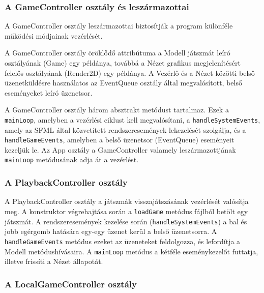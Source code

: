 \documentclass[12pt, twoside]{report}
\begin{document}
\subsubsection{A GameController osztály és leszármazottai}

A GameController osztály leszármazottai biztosítják a program különféle működési módjainak vezérlését. 

A GameController osztály öröklődő attribútuma a Modell játszmát leíró osztályának (Game) egy példánya, továbbá a Nézet grafikus megjelenítésért felelős osztályának (Render2D) egy példánya. A Vezérlő és a Nézet közötti belső üzenetküldésre használatos az EventQueue osztály által megvalósított, belső eseményeket leíró üzenetsor. 

A GameController osztály három absztrakt metódust tartalmaz. Ezek a {\tt mainLoop}, amelyben a vezérlési ciklust kell megvalósítani, a {\tt handleSystemEvents}, amely az SFML által közvetített rendszeresemények lekezelését szolgálja, és a {\tt handleGameEvents}, amelyben a belső üzenetsor (EventQueue) eseményeit kezeljük le. Az App osztály a \break GameController valamely leszármazottjának {\tt mainLoop} metódusának adja át a vezérlést.

\subsubsection{A PlaybackController osztály}

A PlaybackController osztály a játszmák visszajátszásának vezérlését valósítja meg. A konstruktor végrehajtása során a {\tt loadGame} metódus fájlból betölt egy játszmát. A rendszeresemények kezelése során ({\tt handleSystemEvents}) a bal és jobb egérgomb hatására egy-egy üzenet kerül a belső üzenetsorra. A {\tt handleGameEvents} metódus ezeket az üzeneteket feldolgozza, és lefordítja a Modell metódushívásaira. A {\tt mainLoop} metódus a kétféle eseménykezelőt futtatja, illetve frissíti a Nézet állapotát.

\subsubsection{A LocalGameController osztály}
\end{document}
